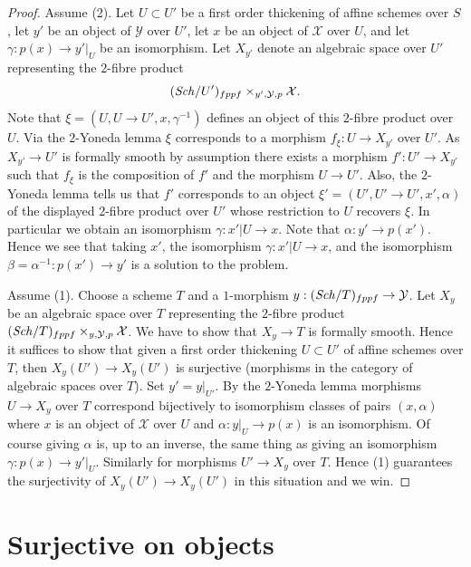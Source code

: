 \begin{proof}
Assume (2). Let $U \subset U'$ be a first order thickening
of affine schemes over $S$, let $y'$ be an object of $\mathcal{Y}$
over $U'$, let $x$ be an object of $\mathcal{X}$ over $U$,
and let $\gamma : p(x) \to y'|_U$ be an isomorphism. Let
$X_{y'}$ denote an algebraic space over $U'$ representing the $2$-fibre
product
$$
(\mathit{Sch}/U')_{fppf} \times_{y', \mathcal{Y}, p} \mathcal{X}.
$$
Note that $\xi = (U, U \to U', x, \gamma^{-1})$ defines an object of
this $2$-fibre product over $U$. Via the $2$-Yoneda lemma $\xi$ corresponds
to a morphism $f_\xi : U \to X_{y'}$ over $U'$. As $X_{y'} \to U'$ is
formally smooth by assumption there exists a morphism
$f' : U' \to X_{y'}$ such that $f_\xi$ is the composition of $f'$
and the morphism $U \to U'$. Also, the $2$-Yoneda lemma tells us that
$f'$ corresponds to an object $\xi' = (U', U' \to U', x', \alpha)$ of
the displayed $2$-fibre product over $U'$ whose restriction to
$U$ recovers $\xi$. In particular we obtain an isomorphism
$\gamma : x'|U \to x$. Note that $\alpha : y' \to p(x')$.
Hence we see that taking $x'$, the isomorphism
$\gamma : x'|U \to x$, and the isomorphism
$\beta = \alpha^{-1} : p(x') \to y'$
is a solution to the problem.

\medskip\noindent
Assume (1). Choose a scheme $T$ and a $1$-morphism
$y : (\mathit{Sch}/T)_{fppf} \to \mathcal{Y}$. Let
$X_y$ be an algebraic space over $T$ representing the $2$-fibre product
$(\mathit{Sch}/T)_{fppf} \times_{y, \mathcal{Y}, p} \mathcal{X}$.
We have to show that $X_y \to T$ is formally smooth.
Hence it suffices to show that given a first order thickening
$U \subset U'$ of affine schemes over $T$, then
$X_y(U') \to X_y(U')$ is surjective (morphisms in the
category of algebraic spaces over $T$). Set $y' = y|_{U'}$.
By the $2$-Yoneda lemma morphisms $U \to X_y$ over $T$ correspond bijectively
to isomorphism classes of pairs $(x, \alpha)$ where $x$ is an object
of $\mathcal{X}$ over $U$ and $\alpha : y|_U \to p(x)$ is an isomorphism.
Of course giving $\alpha$ is, up to an inverse, the same thing as giving
an isomorphism $\gamma : p(x) \to y'|_U$.
Similarly for morphisms $U' \to X_y$ over $T$. Hence (1) guarantees
the surjectivity of $X_y(U') \to X_y(U')$
in this situation and we win.
\end{proof}







\section{Surjective on objects}
\label{section-formally-surjective}

